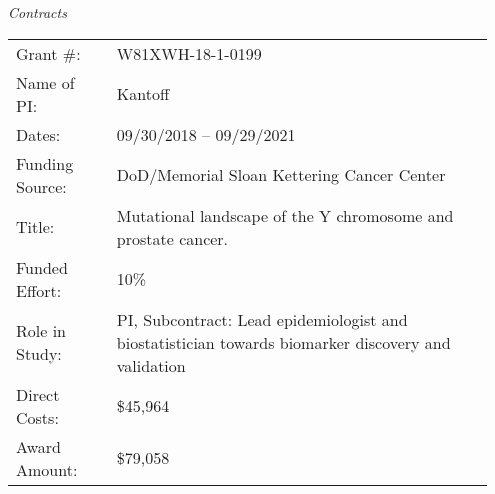 \documentclass[11pt, a4paper]{article} %
\begin{document}
\emph{Contracts}
\begin{longtable}{@{}p{0.2\linewidth} p{0.75\linewidth}}
Grant \#: & W81XWH-18-1-0199\\
Name of PI: & Kantoff\\
Dates: & 09/30/2018 -- 09/29/2021\\
Funding Source: & DoD/Memorial Sloan Kettering Cancer Center\\
Title: & Mutational landscape of the Y chromosome and prostate cancer.\\
Funded Effort: & 10\%\\
Role in Study: & PI, Subcontract: Lead epidemiologist and biostatistician towards biomarker discovery and validation\\
Direct Costs: & \$45,964\\
Award Amount: & \$79,058\\
\end{longtable}
\end{document}
